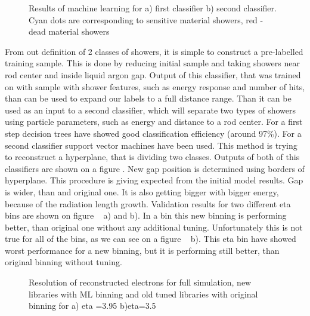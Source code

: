 \begin{figure}[!tbp]
\begin{minipage}[h]{0.49\linewidth}
\end{minipage}
\hfill
\begin{minipage}[h]{0.49\linewidth}
\end{minipage}
\caption{Results of machine learning for a) first classifier b) second classifier. Cyan dots are corresponding to sensitive material showers, red - dead material showers}
\label{fig:Class}
\end{figure}


From out definition of 2 classes of showers, it is simple to construct a pre-labelled training sample. This is done by reducing initial sample and taking showers near rod center and inside liquid argon gap. Output of this classifier, that was trained on with sample with shower features, such as energy response and number of hits, than can be used to expand our labels to a full distance range. Than it can be used as an input to a second classifier, which will separate two types of showers using particle parameters, such as energy and distance to a rod center. For a first step decision trees have showed good classification efficiency (around 97\%). For a second classifier support vector machines have been used. This method is trying to reconstruct a hyperplane, that is dividing two classes. Outputs of both of this classifiers are shown on a figure . New gap position is determined using borders of hyperplane. This procedure is giving expected from the initial model results. Gap is wider, than and original one. It is also getting bigger with bigger energy, because of the radiation length growth. 
Validation results for two different eta bins are shown on figure ~ a) and b). In a bin this new binning is performing better, than original one without any additional tuning. Unfortunately this is not true for all of the bins, as we can see on a figure ~ b). This eta bin have showed worst performance for a new binning, but it is performing still better, than original binning without tuning.

\begin{figure}[!tbp]
\begin{minipage}[h]{0.49\linewidth}
\end{minipage}
\hfill
\begin{minipage}[h]{0.49\linewidth}
\end{minipage}
\caption{Resolution of reconstructed electrons for full simulation, new libraries with ML binning and old tuned libraries with original binning for a) eta =3.95 b)eta=3.5 }
\label{fig:Class}
\end{figure}

